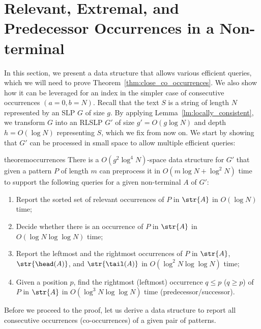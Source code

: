 \section{Relevant, Extremal, and Predecessor Occurrences in a Non-terminal}
\label{indexgapped:sec:occurrences}
In this section, we present a data structure that allows various efficient queries, which we will need to prove Theorem~\ref{thm:close_co_occurrences}.
We also show how it can be leveraged for an index in the simpler case of consecutive occurrences $(a = 0, b = N)$. 
Recall that the text $S$ is a string of length $N$ represented by an SLP $G$ of size $g$. By applying Lemma~\ref{lm:locally_consistent}, we transform $G$ into an RLSLP $G'$ of size $g' = O(g \log N)$ and depth $h = O(\log N)$ representing $S$, which we fix from now on. We start by showing that $G'$ can be processed in small space to allow multiple efficient queries:

\begin{restatable}{theorem}{occurrences}\label{th:occurrences}
There is a $O(g^2\log^4 N)$-space data structure for $G'$ that given a pattern $P$ of length $m$ can preprocess it in $O(m \log N + \log^2 N)$ time to support the following queries for a given non-terminal $A$ of $G'$:
\begin{enumerate}
\item Report the sorted set of relevant occurrences of $P$ in $\str{A}$ in $O(\log N)$ time;
\item Decide whether there is an occurrence of $P$ in $\str{A}$ in $O(\log N \log \log N)$ time;
\item Report the leftmost and the rightmost occurrences of $P$ in $\str{A}$, $\str{\head(A)}$, and $\str{\tail(A)}$ in $O(\log^2 N \log \log N)$ time;
\item Given a position $p$, find the rightmost (leftmost) occurrence $q \le p$ ($q \ge p$) of $P$ in $\str{A}$ in $O(\log^3 N \log \log N)$ time (predecessor/successor). 
\end{enumerate}
\end{restatable}
%
\noindent Before we proceed to the proof, let us derive a data structure to report all consecutive occurrences (co-occurrences) of a given pair of patterns.

